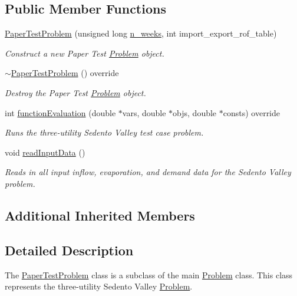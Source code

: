 \subsection*{Public Member Functions}
\begin{DoxyCompactItemize}
\item 
\mbox{\hyperlink{classPaperTestProblem_acc053a5b4515f3959494ce58c763d582}{Paper\+Test\+Problem}} (unsigned long \mbox{\hyperlink{classProblem_ac7513bb0ecdfa4bbb7d2ada3595d71ec}{n\+\_\+weeks}}, int import\+\_\+export\+\_\+rof\+\_\+table)
\begin{DoxyCompactList}\small\item\em Construct a new Paper Test \mbox{\hyperlink{classProblem}{Problem}} object. \end{DoxyCompactList}\item 
\mbox{\hyperlink{classPaperTestProblem_a571a92266d4c58ebc27e20391f7ad81b}{$\sim$\+Paper\+Test\+Problem}} () override
\begin{DoxyCompactList}\small\item\em Destroy the Paper Test \mbox{\hyperlink{classProblem}{Problem}} object. \end{DoxyCompactList}\item 
int \mbox{\hyperlink{classPaperTestProblem_a6db78df74d40f69a750b164caaca75c7}{function\+Evaluation}} (double $\ast$vars, double $\ast$objs, double $\ast$consts) override
\begin{DoxyCompactList}\small\item\em Runs the three-\/utility Sedento Valley test case problem. \end{DoxyCompactList}\item 
void \mbox{\hyperlink{classPaperTestProblem_ae4bcc17d6ceab628f88174306d54fdc9}{read\+Input\+Data}} ()
\begin{DoxyCompactList}\small\item\em Reads in all input inflow, evaporation, and demand data for the Sedento Valley problem. \end{DoxyCompactList}\end{DoxyCompactItemize}
\subsection*{Additional Inherited Members}


\subsection{Detailed Description}
The {\ttfamily \mbox{\hyperlink{classPaperTestProblem}{Paper\+Test\+Problem}}} class is a subclass of the main {\ttfamily \mbox{\hyperlink{classProblem}{Problem}}} class. This class represents the three-\/utility Sedento Valley \mbox{\hyperlink{classProblem}{Problem}}. 

